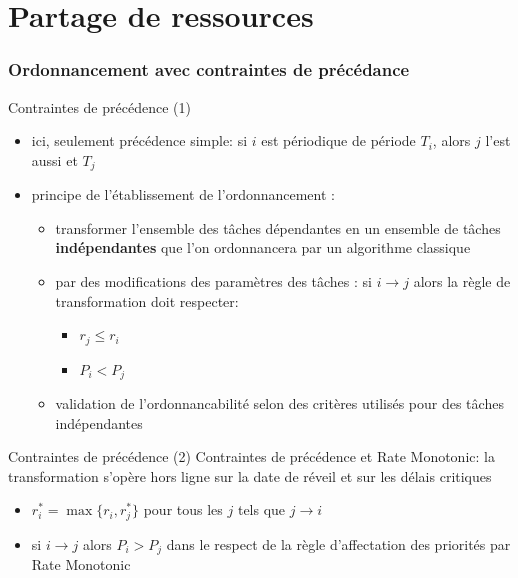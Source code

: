 %
%
%

\part{Partage de ressources}

\section{Ordonnancement avec contraintes de précédance}

\begin{frame}{Contraintes de précédence (1)} 
  \begin{itemize}
  \item ici,  seulement précédence simple: si $i$  est périodique de
    période $T_i$, alors $j$ l'est aussi et $T_j$
  \item principe de l'établissement de l'ordonnancement :
    \begin{itemize} 
    \item transformer l'ensemble des tâches dépendantes en un ensemble
      de  tâches \textbf{indépendantes} que  l'on ordonnancera  par un
      algorithme classique
    \item par des modifications des  paramètres des tâches : si $i →
      j$ alors la règle de transformation doit respecter:
      \begin{itemize} 
      \item $r_j ≤ r_i$
      \item $P_i < P_j$
      \end{itemize} 
    \item  validation  de   l'ordonnancabilité  selon  des  critères
      utilisés pour des tâches indépendantes
    \end{itemize}
  \end{itemize}
\end{frame}

\begin{frame}{Contraintes de précédence (2)} 
  Contraintes  de  précédence  et  Rate Monotonic:  la  transformation
  s'opère hors ligne sur la date de réveil et sur les délais critiques
  \begin{itemize} 
  \item $r^*_i = \max\{r_i, r^*_j\}$ pour tous les $j$ tels que $j →
    i$
  \item si $i  → j$ alors $P_i > P_j$ dans  le respect de la
    règle d'affectation des priorités par Rate Monotonic
  \end{itemize}
\end{frame} 


